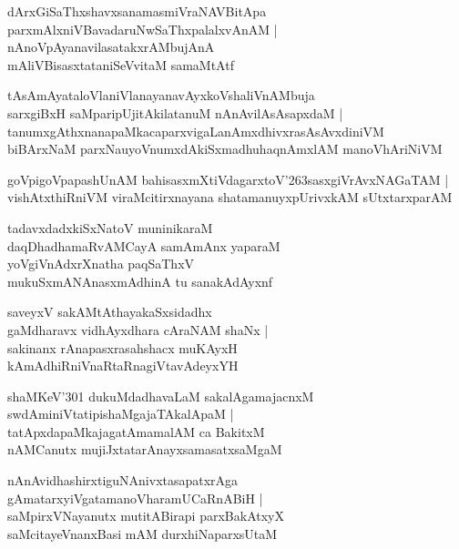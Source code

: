 \documentclass[twoside,12pt,openright]{book}
\def\S{\char'263}
\newcounter{shloka}[chapter]
\begin{document}
\begin{shloka}%
dArxGiSaThxshavxsanamasmiVraNAVBitApa \\
parxmAlxniVBavadaruNwSaThxpalalxvAnAM |\\
nAnoVpAyanavilasatakxrAMbujAnA \\
mAliVBisasxtataniSeVvitaM samaMtAtf
\end{shloka}

\begin{shloka}%
tAsAmAyataloVlaniVlanayanavAyxkoVshaliVnAMbuja \\
sarxgiBxH saMparipUjitAkilatanuM nAnAvilAsAsapxdaM |\\
tanumxgAthxnanapaMkacaparxvigaLanAmxdhivxrasAsAvxdiniVM \\
biBArxNaM parxNauyoVnumxdAkiSxmadhuhaqnAmxlAM manoVhAriNiVM 
\end{shloka}

\begin{shloka}%
goVpigoVpapashUnAM bahisasxmXtiVdagarxtoV\S sasxgiVrAvxNAGaTAM |\\
vishAtxthiRniVM viraMcitirxnayana shatamanuyxpUrivxkAM sUtxtarxparAM 
\end{shloka}

\begin{shloka}%
tadavxdadxkiSxNatoV muninikaraM \\
daqDhadhamaRvAMCayA samAmAnx yaparaM \\
yoVgiVnAdxrXnatha paqSaThxV \\
mukuSxmANAnasxmAdhinA tu sanakAdAyxnf 
\end{shloka}

\begin{shloka}%
saveyxV sakAMtAthayakaSxsidadhx \\
gaMdharavx vidhAyxdhara cAraNAM shaNx |\\
sakinanx rAnapasxrasahshacx muKAyxH \\
kAmAdhiRniVnaRtaRnagiVtavAdeyxYH
\end{shloka}

\begin{shloka}%
shaMKeV\char'301 dukuMdadhavaLaM sakalAgamajacnxM \\
swdAminiVtatipishaMgajaTAkalApaM |\\
tatApxdapaMkajagatAmamalAM ca BakitxM \\
nAMCanutx mujiJxtatarAnayxsamasatxsaMgaM  
\end{shloka}

\begin{shloka}%
nAnAvidhashirxtiguNAnivxtasapatxrAga \\
gAmatarxyiVgatamanoVharamUCaRnABiH |\\
saMpirxVNayanutx mutitABirapi parxBakAtxyX \\
saMcitayeVnanxBasi mAM durxhiNaparxsUtaM 
\end{shloka}
\end{document}
